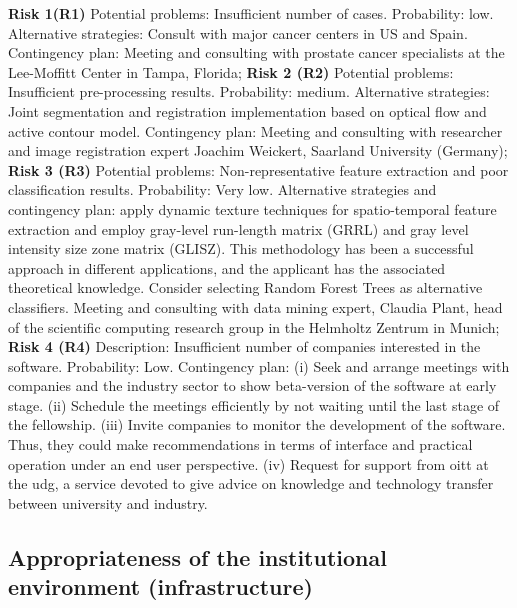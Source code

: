 \textbf{Risk 1(R1)} Potential problems: Insufficient number of cases. Probability: low. Alternative strategies:  Consult with major cancer centers in US and Spain. Contingency plan: Meeting and consulting with prostate cancer specialists at the Lee-Moffitt Center in Tampa, Florida; 
\textbf{Risk 2 (R2)} Potential problems: Insufficient pre-processing results. Probability: medium. Alternative strategies: Joint segmentation and registration implementation based on optical flow and active contour model. Contingency plan: Meeting and consulting with researcher and image registration expert Joachim Weickert, Saarland University (Germany);
\textbf{Risk 3 (R3)} Potential problems: Non-representative feature extraction and poor classification results. Probability: Very low. Alternative strategies and contingency plan: apply dynamic texture techniques for spatio-temporal feature extraction and employ gray-level run-length matrix (GRRL) and gray level intensity size zone matrix (GLISZ). 
This methodology has been a successful approach in different applications, and the applicant has the associated theoretical knowledge. 
Consider selecting Random Forest Trees as alternative classifiers. Meeting and consulting with data mining expert, Claudia Plant, head of the scientific computing research group in the Helmholtz Zentrum in Munich;
\textbf{Risk 4 (R4)} Description: Insufficient number of companies interested in the software. Probability: Low. Contingency plan: (i) Seek and arrange meetings with companies and the industry sector to show beta-version of the software at early stage. (ii) Schedule the meetings efficiently by not waiting until the last stage of the fellowship. (iii) Invite companies to monitor the development of the software. Thus, they could make recommendations in terms of interface and practical operation under an end user perspective. (iv) Request for support from \ac{oitt} at the \ac{udg}, a service devoted to give advice on knowledge and technology transfer between university and industry.

\subsection{Appropriateness of the institutional environment (infrastructure)}
\label{sec:institution}

